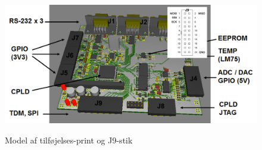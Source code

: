 \begin{figure}[H]
\centering
{\includegraphics[width=\textwidth]{filer/design/Billeder/devkit_j9}}
\caption{Model af tilføjelses-print og J9-stik }
\label{lab:devkit_j9}
\end{figure}